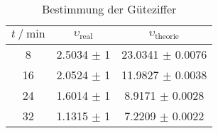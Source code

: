 \begin{table}
        \centering
        \label{tab:gueteziffer}
        \begin{tabular}{c c c}
        \toprule
        $t \mathbin{/} \si{\minute} $ & $\upsilon_\text{real}$ & $\upsilon_\text{theorie}$ \\
        \midrule
        8  & 2.5034 $\pm$ 1 & 23.0341 $\pm$ 0.0076 \\
        16 & 2.0524 $\pm$ 1 & 11.9827 $\pm$ 0.0038 \\
        24 & 1.6014 $\pm$ 1 & 8.9171  $\pm$ 0.0028 \\
        32 & 1.1315 $\pm$ 1 & 7.2209  $\pm$ 0.0022 \\
        \bottomrule
        \end{tabular}
        \caption{Bestimmung der Güteziffer}
        \end{table}